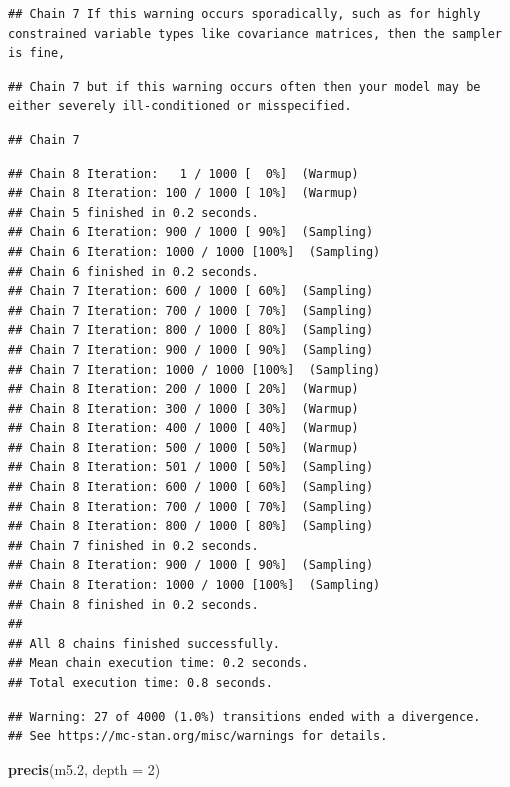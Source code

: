 \documentclass[
]{book}
\newenvironment{Shaded}{\begin{snugshade}}{\end{snugshade}}
\newcommand{\AttributeTok}[1]{\textcolor[rgb]{0.13,0.29,0.53}{#1}}
\newcommand{\DecValTok}[1]{\textcolor[rgb]{0.00,0.00,0.81}{#1}}
\newcommand{\FloatTok}[1]{\textcolor[rgb]{0.00,0.00,0.81}{#1}}
\newcommand{\FunctionTok}[1]{\textcolor[rgb]{0.13,0.29,0.53}{\textbf{#1}}}
\newcommand{\NormalTok}[1]{#1}
\begin{document}
\begin{verbatim}
## Chain 7 If this warning occurs sporadically, such as for highly constrained variable types like covariance matrices, then the sampler is fine,
\end{verbatim}

\begin{verbatim}
## Chain 7 but if this warning occurs often then your model may be either severely ill-conditioned or misspecified.
\end{verbatim}

\begin{verbatim}
## Chain 7
\end{verbatim}

\begin{verbatim}
## Chain 8 Iteration:   1 / 1000 [  0%]  (Warmup) 
## Chain 8 Iteration: 100 / 1000 [ 10%]  (Warmup) 
## Chain 5 finished in 0.2 seconds.
## Chain 6 Iteration: 900 / 1000 [ 90%]  (Sampling) 
## Chain 6 Iteration: 1000 / 1000 [100%]  (Sampling) 
## Chain 6 finished in 0.2 seconds.
## Chain 7 Iteration: 600 / 1000 [ 60%]  (Sampling) 
## Chain 7 Iteration: 700 / 1000 [ 70%]  (Sampling) 
## Chain 7 Iteration: 800 / 1000 [ 80%]  (Sampling) 
## Chain 7 Iteration: 900 / 1000 [ 90%]  (Sampling) 
## Chain 7 Iteration: 1000 / 1000 [100%]  (Sampling) 
## Chain 8 Iteration: 200 / 1000 [ 20%]  (Warmup) 
## Chain 8 Iteration: 300 / 1000 [ 30%]  (Warmup) 
## Chain 8 Iteration: 400 / 1000 [ 40%]  (Warmup) 
## Chain 8 Iteration: 500 / 1000 [ 50%]  (Warmup) 
## Chain 8 Iteration: 501 / 1000 [ 50%]  (Sampling) 
## Chain 8 Iteration: 600 / 1000 [ 60%]  (Sampling) 
## Chain 8 Iteration: 700 / 1000 [ 70%]  (Sampling) 
## Chain 8 Iteration: 800 / 1000 [ 80%]  (Sampling) 
## Chain 7 finished in 0.2 seconds.
## Chain 8 Iteration: 900 / 1000 [ 90%]  (Sampling) 
## Chain 8 Iteration: 1000 / 1000 [100%]  (Sampling) 
## Chain 8 finished in 0.2 seconds.
## 
## All 8 chains finished successfully.
## Mean chain execution time: 0.2 seconds.
## Total execution time: 0.8 seconds.
\end{verbatim}

\begin{verbatim}
## Warning: 27 of 4000 (1.0%) transitions ended with a divergence.
## See https://mc-stan.org/misc/warnings for details.
\end{verbatim}

\begin{Shaded}
\begin{Highlighting}[]
\FunctionTok{precis}\NormalTok{(m5}\FloatTok{.2}\NormalTok{, }\AttributeTok{depth =} \DecValTok{2}\NormalTok{)}
\end{Highlighting}
\end{Shaded}
\end{document}
